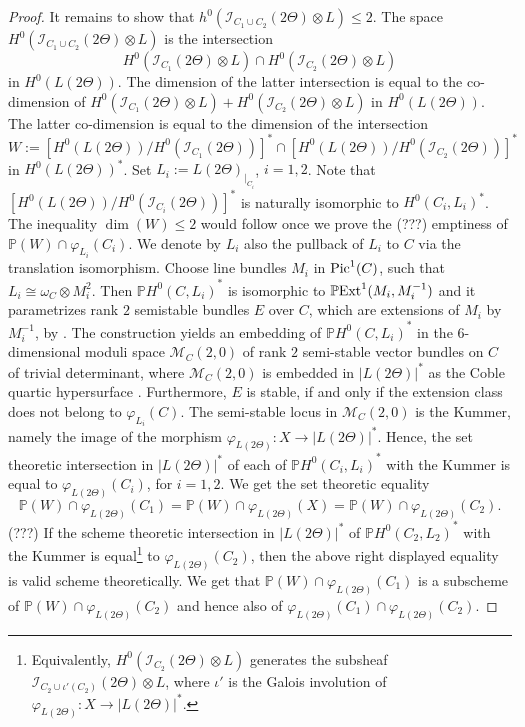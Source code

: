 \documentclass[12pt]{amsart}
\numberwithin{equation}{subsection}
\theoremstyle{plain}
\theoremstyle{definition}
\newcommand{\M}{{\mathcal M}}
\newcommand{\PP}{{\mathbb P}}
\newcommand{\restricted}[2]{#1_{\mid_{#2}}}
\newcommand{\Pic}{{\rm Pic}}
\newcommand{\Ext}{{\rm Ext}}
\newcommand{\Ideal}[1]{{\mathcal I}_{#1}}
\begin{document}
{\begin{proof}
It remains to show that $h^0(\Ideal{C_1\cup C_2}(2\Theta)\otimes L)\leq 2$. 
The space $H^0(\Ideal{C_1\cup C_2}(2\Theta)\otimes L)$ is the intersection
\[
H^0(\Ideal{C_1}(2\Theta)\otimes L)\cap H^0(\Ideal{C_2}(2\Theta)\otimes L)
\]
in $H^0(L(2\Theta))$. The dimension of the latter intersection  is equal to the co-dimension of
$H^0(\Ideal{C_1}(2\Theta)\otimes L)+ H^0(\Ideal{C_2}(2\Theta)\otimes L)$ in $H^0(L(2\Theta))$. The latter co-dimension is equal to the dimension of the intersection 
\[
W:=[H^0(L(2\Theta))/H^0(\Ideal{C_1}(2\Theta))]^*\cap [H^0(L(2\Theta))/H^0(\Ideal{C_2}(2\Theta))]^*
\]
in $H^0(L(2\Theta))^*$. 
Set $L_i:=L(2\Theta\restricted{)}{C_i}$, $i=1,2$. 
Note that $[H^0(L(2\Theta))/H^0(\Ideal{C_i}(2\Theta))]^*$ is naturally isomorphic to $H^0(C_i,L_i)^*$.
The inequality $\dim(W)\leq 2$ would follow once we prove the (???) emptiness of $\PP(W)\cap\varphi_{L_i}(C_i)$.
We denote by $L_i$ also the pullback of $L_i$ to $C$ via the translation isomorphism.
Choose line bundles $M_i$ in $\Pic^1(C)$, such that $L_i\cong \omega_C\otimes M_i^2$. Then 
$\PP{H^0(C,L_i)}^*$ is isomorphic to $\PP\Ext^1(M_i,M_{i}^{-1})$ and it parametrizes rank $2$ semistable bundles $E$ over $C$, which are extensions of $M_i$ by $M_i^{-1}$, by \cite{beauville}. 
The construction yields an embedding of $\PP{H^0(C,L_i)}^*$ in the $6$-dimensional moduli space $\M_C(2,0)$ of rank $2$ semi-stable vector bundles on $C$ of trivial determinant, where $\M_C(2,0)$ is embedded in $|L(2\Theta)|^*$ as the Coble quartic hypersurface \cite[Sec. 2.3]{pauly}. 
Furthermore, $E$ is stable, if and only if the extension class does not belong to $\varphi_{L_i}(C)$. The semi-stable locus in
$\M_C(2,0)$ is the Kummer, namely the image of the morphism $\varphi_{L(2\Theta)}:X\rightarrow |L(2\Theta)|^*$.
Hence, the set theoretic intersection in $|L(2\Theta)|^*$ of each of $\PP{H^0(C_i,L_i)}^*$ with the Kummer is equal to $\varphi_{L(2\Theta)}(C_i)$, for $i=1,2$. We get the set theoretic equality
\[
\PP(W)\cap \varphi_{L(2\Theta)}(C_1)=\PP(W)\cap \varphi_{L(2\Theta)}(X)=\PP(W)\cap \varphi_{L(2\Theta)}(C_2).
\]
(???) If the scheme theoretic  intersection in $|L(2\Theta)|^*$ of $\PP{H^0(C_2,L_2)}^*$ with the Kummer is equal\footnote{
Equivalently, $H^0(\Ideal{C_2}(2\Theta)\otimes L)$ generates the subsheaf $\Ideal{C_2\cup \iota'(C_2)}(2\Theta)\otimes L$,
where $\iota'$ is the Galois involution of $\varphi_{L(2\Theta)}:X\rightarrow |L(2\Theta)|^*$.
} 
to $\varphi_{L(2\Theta)}(C_2)$, then the above right displayed equality is valid scheme theoretically. 
We get that $\PP(W)\cap \varphi_{L(2\Theta)}(C_1)$ is a subscheme of $\PP(W)\cap \varphi_{L(2\Theta)}(C_2)$ and hence also of
$\varphi_{L(2\Theta)}(C_1)\cap \varphi_{L(2\Theta)}(C_2)$.


\end{proof}}
\end{document}
